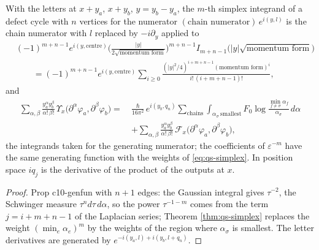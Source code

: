 \begin{proposition}
\label{prop:qs-genfun}
With the letters at $x+y_a$, $x+y_b$, $y=y_b-y_a$, the $m$-th simplex integrand of a defect cycle with $n$ vertices for the numerator $(\text{chain numerator})\,e^{i(y,l)}$ is the chain numerator with $l$ replaced by $-i\partial_y$ applied to
\[
\begin{aligned}
&(-1)^{m+n-1}e^{i(y,\text{centre})}\Big(\frac{|y|}{2\sqrt{\text{momentum form}}}\Big)^{m+n-1}I_{m+n-1}\big(|y|\sqrt{\text{momentum form}}\big)\\
&\qquad=(-1)^{m+n-1}e^{i(y,\text{centre})}\sum_{i\ge0}\frac{(|y|^2/4)^{i+m+n-1}(\text{momentum form})^i}{i!\,(i+m+n-1)!},
\end{aligned}
\]
and
\[
\begin{aligned}
\sum_{\alpha,\beta}\frac{y_a^\alpha y_b^\beta}{\alpha!\,\beta!}\,\Upsilon_x\big(\partial^\alpha\varphi_a,\partial^\beta\varphi_b\big)=\ &\frac{\hbar}{16\pi^2}\,e^{i(y_b,q_n)}\sum_{\text{chains}}\int_{\alpha_\sigma\ \text{smallest}}F_0\log\frac{\min_{f\ne\sigma}\alpha_f}{\alpha_\sigma}\,d\alpha\\
&+\sum_{\alpha,\beta}\frac{y_a^\alpha y_b^\beta}{\alpha!\,\beta!}\,\mathcal F_x\big(\partial^\alpha\varphi_a,\partial^\beta\varphi_b\big),
\end{aligned}
\]
the integrands taken for the generating numerator; the coefficients of $\varepsilon^{-m}$ have the same generating function with the weights of \eqref{eq:qs-simplex}. In position space $iq_j$ is the derivative of the product of the outputs at $x$.
\end{proposition}

\begin{proof}
Prop c10-genfun with $n+1$ edges: the Gaussian integral gives $\tau^{-2}$, the Schwinger measure $\tau^nd\tau\,d\alpha$, so the power $\tau^{-1-m}$ comes from the term $j=i+m+n-1$ of the Laplacian series; Theorem \ref{thm:qs-simplex} replaces the weight $(\min_e\alpha_e)^m$ by the weights of the region where $\alpha_\sigma$ is smallest. The letter derivatives are generated by $e^{-i(y_a,l)+i(y_b,l+q_n)}$.
\end{proof}


